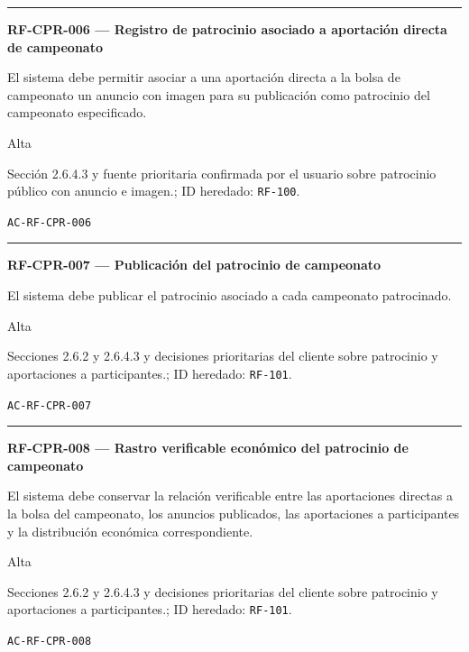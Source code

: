 \documentclass[10pt,letterpaper]{article}
\begin{document}
\vspace{0.25em}\hrule\vspace{0.65em}
\noindent\textbf{RF-CPR-006 --- Registro de patrocinio asociado a aportación directa de campeonato}\par
\begin{description}[style=nextline,leftmargin=3.15cm,labelwidth=2.8cm,font=\normalfont\bfseries]
\item[Obligación] El sistema debe permitir asociar a una aportación directa a la bolsa de campeonato un anuncio con imagen para su publicación como patrocinio del campeonato especificado.
\item[Prioridad] Alta
\item[Procedencia] Sección 2.6.4.3 y fuente prioritaria confirmada por el usuario sobre patrocinio público con anuncio e imagen.; ID heredado: \texttt{RF-100}.
\item[Verificación] \texttt{AC-RF-CPR-006}
\end{description}
\vspace{0.25em}\hrule\vspace{0.65em}
\noindent\textbf{RF-CPR-007 --- Publicación del patrocinio de campeonato}\par
\begin{description}[style=nextline,leftmargin=3.15cm,labelwidth=2.8cm,font=\normalfont\bfseries]
\item[Obligación] El sistema debe publicar el patrocinio asociado a cada campeonato patrocinado.
\item[Prioridad] Alta
\item[Procedencia] Secciones 2.6.2 y 2.6.4.3 y decisiones prioritarias del cliente sobre patrocinio y aportaciones a participantes.; ID heredado: \texttt{RF-101}.
\item[Verificación] \texttt{AC-RF-CPR-007}
\end{description}
\vspace{0.25em}\hrule\vspace{0.65em}
\noindent\textbf{RF-CPR-008 --- Rastro verificable económico del patrocinio de campeonato}\par
\begin{description}[style=nextline,leftmargin=3.15cm,labelwidth=2.8cm,font=\normalfont\bfseries]
\item[Obligación] El sistema debe conservar la relación verificable entre las aportaciones directas a la bolsa del campeonato, los anuncios publicados, las aportaciones a participantes y la distribución económica correspondiente.
\item[Prioridad] Alta
\item[Procedencia] Secciones 2.6.2 y 2.6.4.3 y decisiones prioritarias del cliente sobre patrocinio y aportaciones a participantes.; ID heredado: \texttt{RF-101}.
\item[Verificación] \texttt{AC-RF-CPR-008}
\end{description}
\end{document}
